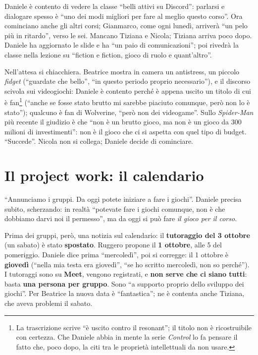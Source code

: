 Daniele è contento di vedere la classe ``belli attivi su Discord'': parlarsi e
dialogare spesso è ``uno dei modi migliori per fare al meglio questo corso''. Ora
cominciano anche gli altri corsi; Gianmarco, come ogni lunedì, arriverà ``un pelo
più in ritardo'', verso le sei. Mancano Tiziana e Nicola; Tiziana arriva poco dopo.
Daniele ha aggiornato le slide e ha ``un paio di comunicazioni''; poi rivedrà la
classe nella lezione su ``fiction e fiction, gioco di ruolo e quant'altro''.

Nell'attesa si chiacchiera. Beatrice mostra in camera un antistress, un piccolo
\emph{fidget} (``guardate che bello'', ``in questo periodo proprio necessario''),
e il discorso scivola sui videogiochi: Daniele è contento perché è appena uscito un
titolo di cui è fan\footnote{La trascrizione scrive ``è uscito contro il
resonant''; il titolo non è ricostruibile con certezza. Che Daniele abbia in mente
la serie \emph{Control} lo fa pensare il fatto che, poco dopo, la citi tra le
proprietà intellettuali da non usare.} (``anche se fosse stato brutto mi sarebbe
piaciuto comunque, però non lo è stato''); qualcuno è fan di Wolverine, ``però non
dei videogame''. Sullo \emph{Spider-Man} più recente il giudizio è che ``non è un
brutto gioco, ma non è un gioco da 300 milioni di investimenti'': non è il gioco
che ci si aspetta con quel tipo di budget. ``Succede''. Nicola non si collega;
Daniele decide di cominciare.

\section{Il project work: il calendario}
\label{a7:sec:calendario}

``Annunciamo i gruppi. Da oggi potete iniziare a fare i giochi''. Daniele precisa
subito, scherzando: in realtà ``potevate fare i giochi comunque, non è che dobbiamo
darvi noi il permesso'', ma da oggi si può fare \emph{il gioco per il corso}.

Prima dei gruppi, però, una notizia sul calendario: il \textbf{tutoraggio del 3
ottobre} (un sabato) è stato \textbf{spostato}. Ruggero propone il \textbf{1
ottobre}, alle 5 del pomeriggio. Daniele dice prima ``mercoledì'', poi si corregge:
il 1 ottobre è \textbf{giovedì} (``nella mia testa era giovedì'', ``se ho scritto
mercoledì, non so perché''). I tutoraggi sono su \textbf{Meet}, vengono registrati, e
\textbf{non serve che ci siano tutti}: basta \textbf{una persona per gruppo}. Sono ``a
supporto proprio dello sviluppo dei giochi''. Per Beatrice la nuova data è
``fantastica''; ne è contenta anche Tiziana, che aveva problemi il sabato.

